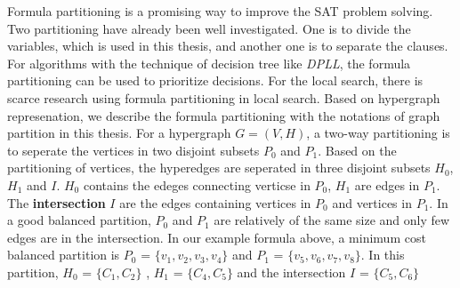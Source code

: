 \documentclass[12pt,a4paper,twoside]{scrartcl}
\numberwithin{equation}{section}
\begin{document}
Formula partitioning is a promising way to improve the SAT problem solving. Two partitioning have already been well investigated. One is to divide the variables, which is used in this thesis, and another one is to separate the clauses. For algorithms with the technique of decision tree like \emph{DPLL}\cite{nieuwenhuis2005abstract}, the formula partitioning can be used to prioritize decisions. For the local search, there is scarce research using formula partitioning in local search. Based on hypergraph represenation, we describe the formula partitioning with the notations of graph partition in this thesis. For a hypergraph $G = (V,H)$,  a two-way partitioning is to seperate the vertices in two disjoint subsets $P_0$ and $P_1$.  Based on the partitioning of vertices, the hyperedges are seperated in three disjoint subsets $H_0$, $H_1$ and $I$. $H_0$ contains the edeges connecting verticse in $P_0$, $H_1$ are edges in $P_1$. The \textbf{intersection} $I$ are the edges containing vertices in $P_0$ and vertices in $P_1$. In a good balanced partition, $P_0$ and $P_1$ are relatively of the same size and only few edges are in the intersection. In our example formula above, a minimum cost balanced partition is $P_0$ = $\{v_1,v_2, v_3, v_4\}$ and $P_1$ = $\{v_5,v_6, v_7, v_8\}$. In this partition, $H_0$ = $\{C_1,C_2\}$ , $H_1$ = $\{C_4,C_5\}$ and the intersection $I$ = $\{C_5,C_6\}$ 
\end{document}
